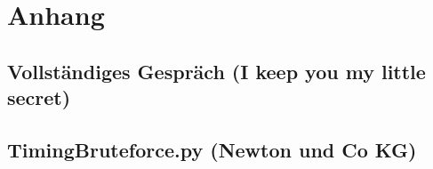 \documentclass[12pt, a4paper, titlepage, oneside]{scrartcl}
\begin{document}
	\section{Anhang}

	\subsection{Vollständiges Gespräch (I keep you my little secret)}
	

	\subsection{TimingBruteforce.py (Newton und Co KG)}
	

\end{document}
